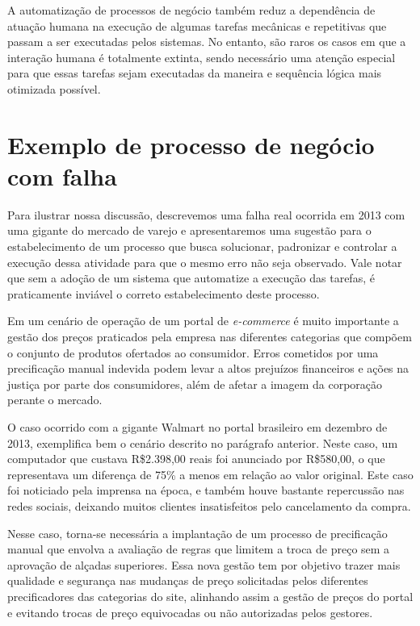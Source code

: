 A automatização de processos de negócio também reduz a dependência de atuação humana na execução de algumas tarefas mecânicas e repetitivas que passam a ser executadas pelos sistemas. No entanto, são raros os casos em que a interação humana é totalmente extinta, sendo necessário uma atenção especial para que essas tarefas sejam executadas da maneira e sequência lógica mais otimizada possível.

\section{Exemplo de processo de negócio com falha}\label{sec:introducao-caso_real}

Para ilustrar nossa discussão, descrevemos uma falha real ocorrida em 2013 com uma gigante do mercado de varejo e apresentaremos uma sugestão para o estabelecimento de um processo que busca solucionar, padronizar e controlar a execução dessa atividade para que o mesmo erro não seja observado. Vale notar que sem a adoção de um sistema que automatize a execução das tarefas, é praticamente inviável o correto estabelecimento deste processo.

Em um cenário de operação de um portal de \textit{e-commerce} é muito importante a gestão dos preços praticados pela empresa nas diferentes categorias que compõem o conjunto de produtos ofertados ao consumidor. Erros cometidos por uma precificação manual indevida podem levar a altos prejuízos financeiros e ações na justiça por parte dos consumidores, além de afetar a imagem da corporação perante o mercado. 

O caso ocorrido com a gigante Walmart no portal brasileiro em dezembro de 2013, exemplifica bem o cenário descrito no parágrafo anterior. Neste caso, um computador que custava R\$2.398,00 reais foi anunciado por R\$580,00, o que representava um diferença de 75\% a menos em relação ao valor original. Este caso foi noticiado pela imprensa na época, e também houve bastante repercussão nas redes sociais, deixando muitos clientes insatisfeitos pelo cancelamento da compra\cite{noticia_erro_walmart}. 

Nesse caso, torna-se necessária a implantação de um processo de precificação manual que envolva a avaliação de regras que limitem a troca de preço sem a aprovação de alçadas superiores. Essa nova gestão tem por objetivo trazer mais qualidade e segurança nas mudanças de preço solicitadas pelos diferentes precificadores das categorias do site, alinhando assim a gestão de preços do portal e evitando trocas de preço equivocadas ou não autorizadas pelos gestores.

